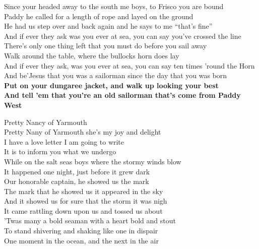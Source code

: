 \documentclass[letterpaper,9pt]{article}
\begin{document}
Since your headed away to the south me boys, to Frisco you are bound \\
Paddy he called for a length of rope and layed on the ground \\
He had us step over and back again and he says to me “that's fine” \\
And if ever they ask was you ever at sea, you can say you've crossed the line \\

There's only one thing left that you must do before you sail away \\
Walk around the table, where the bullocks horn does lay \\
And if ever they ask, was you ever at sea, you can say ten times 'round the Horn \\
And be'Jesus that you was a sailorman since the day that you was born \\

\textbf{Put on your dungaree jacket, and walk up looking your best \\
And tell 'em that you're an old sailorman that's come from Paddy West} \\

\newpage
{}
\Huge
Pretty Nancy of Yarmouth\\

\LARGE
Pretty Nany of Yarmouth she's my joy and delight \\
I have a love letter I am going to write \\
It is to inform you what we undergo \\
While on the salt seas boys where the stormy winds blow \\

It happened one night, just before it grew dark \\
Our honorable captain, he showed us the mark \\
The mark that he showed us it appeared in the sky \\
And it showed us for sure that the storm it was nigh \\

It came rattling down upon us and tossed us about \\
'Twas many a bold seaman with a heart bold and stout \\
To stand shivering and shaking like one in dispair \\
One moment in the ocean, and the next in the air \\
\end{document}
